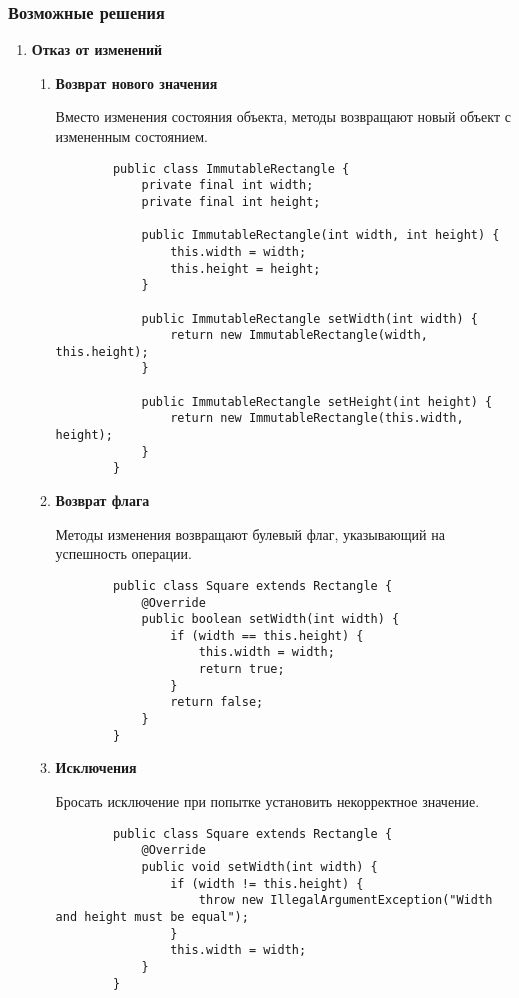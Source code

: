 \subsubsection{Возможные решения}
\begin{enumerate}
    \item \textbf{Отказ от изменений}
    \begin{enumerate}
        \item \textbf{Возврат нового значения}
        
        Вместо изменения состояния объекта, методы возвращают новый объект с измененным состоянием.
        \begin{verbatim}
        public class ImmutableRectangle {
            private final int width;
            private final int height;

            public ImmutableRectangle(int width, int height) {
                this.width = width;
                this.height = height;
            }

            public ImmutableRectangle setWidth(int width) {
                return new ImmutableRectangle(width, this.height);
            }

            public ImmutableRectangle setHeight(int height) {
                return new ImmutableRectangle(this.width, height);
            }
        }
        \end{verbatim}
        
        \item \textbf{Возврат флага}
        
        Методы изменения возвращают булевый флаг, указывающий на успешность операции.
        \begin{verbatim}
        public class Square extends Rectangle {
            @Override
            public boolean setWidth(int width) {
                if (width == this.height) {
                    this.width = width;
                    return true;
                }
                return false;
            }
        }
        \end{verbatim}
        
        \item \textbf{Исключения}
        
        Бросать исключение при попытке установить некорректное значение.
        \begin{verbatim}
        public class Square extends Rectangle {
            @Override
            public void setWidth(int width) {
                if (width != this.height) {
                    throw new IllegalArgumentException("Width and height must be equal");
                }
                this.width = width;
            }
        }
        \end{verbatim}
        

\end{enumerate}
\end{enumerate}
